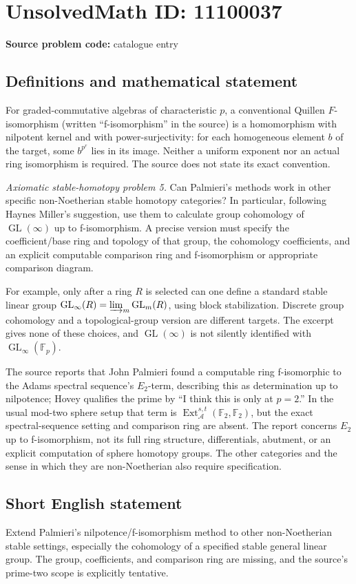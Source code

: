 \documentclass[11pt]{article}
\newcommand{\F}{\mathbb{F}}
\begin{document}
\section*{UnsolvedMath ID: 11100037}
\textbf{Source problem code:} catalogue entry
\subsection{Definitions and mathematical statement}
For graded-commutative algebras of characteristic \(p\), a conventional Quillen \(F\)-isomorphism (written ``f-isomorphism'' in the source) is a homomorphism with nilpotent kernel and with power-surjectivity: for each homogeneous element \(b\) of the target, some \(b^{p^r}\) lies in its image. Neither a uniform exponent nor an actual ring isomorphism is required. The source does not state its exact convention.

\emph{Axiomatic stable-homotopy problem 5.} Can Palmieri's methods work in other specific non-Noetherian stable homotopy categories? In particular, following Haynes Miller's suggestion, use them to calculate group cohomology of \(\operatorname{GL}(\infty)\) up to f-isomorphism. A precise version must specify the coefficient/base ring and topology of that group, the cohomology coefficients, and an explicit computable comparison ring and f-isomorphism or appropriate comparison diagram.

For example, only after a ring \(R\) is selected can one define a standard stable linear group \(\operatorname{GL}_\infty(R)=\varinjlim_m\operatorname{GL}_m(R)\), using block stabilization. Discrete group cohomology and a topological-group version are different targets. The excerpt gives none of these choices, and \(\operatorname{GL}(\infty)\) is not silently identified with \(\operatorname{GL}_\infty(\F_p)\).

The source reports that John Palmieri found a computable ring f-isomorphic to the Adams spectral sequence's \(E_2\)-term, describing this as determination up to nilpotence; Hovey qualifies the prime by ``I think this is only at \(p=2\).'' In the usual mod-two sphere setup that term is \(\operatorname{Ext}_{\mathcal A}^{s,t}(\F_2,\F_2)\), but the exact spectral-sequence setting and comparison ring are absent. The report concerns \(E_2\) up to f-isomorphism, not its full ring structure, differentials, abutment, or an explicit computation of sphere homotopy groups. The other categories and the sense in which they are non-Noetherian also require specification.
\subsection{Short English statement}
Extend Palmieri's nilpotence/f-isomorphism method to other non-Noetherian stable settings, especially the cohomology of a specified stable general linear group. The group, coefficients, and comparison ring are missing, and the source's prime-two scope is explicitly tentative.
\end{document}

